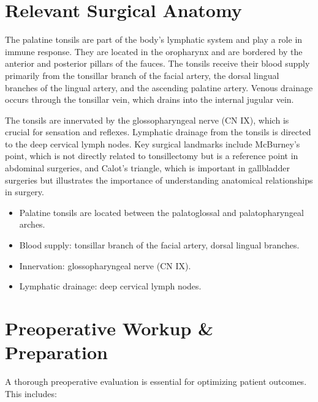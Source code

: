 \section*{Relevant Surgical Anatomy}
The palatine tonsils are part of the body's lymphatic system and play a role in immune response. They are located in the oropharynx and are bordered by the anterior and posterior pillars of the fauces. The tonsils receive their blood supply primarily from the tonsillar branch of the facial artery, the dorsal lingual branches of the lingual artery, and the ascending palatine artery. Venous drainage occurs through the tonsillar vein, which drains into the internal jugular vein. 

The tonsils are innervated by the glossopharyngeal nerve (CN IX), which is crucial for sensation and reflexes. Lymphatic drainage from the tonsils is directed to the deep cervical lymph nodes. Key surgical landmarks include McBurney's point, which is not directly related to tonsillectomy but is a reference point in abdominal surgeries, and Calot's triangle, which is important in gallbladder surgeries but illustrates the importance of understanding anatomical relationships in surgery.

\begin{itemize}
  \item Palatine tonsils are located between the palatoglossal and palatopharyngeal arches.
  \item Blood supply: tonsillar branch of the facial artery, dorsal lingual branches.
  \item Innervation: glossopharyngeal nerve (CN IX).
  \item Lymphatic drainage: deep cervical lymph nodes.
\end{itemize}

\section*{Preoperative Workup \& Preparation}
A thorough preoperative evaluation is essential for optimizing patient outcomes. This includes:

